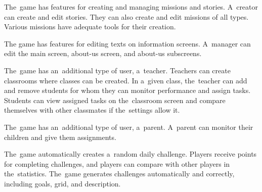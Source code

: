 \begin{enumerate}[label=\textbf{F\arabic*}, ref=\labelenumi]
     The~game has features for creating and managing missions and stories.
    A~creator can create and edit stories.
    They can also create and edit missions of all types.
    Various missions have adequate tools for their creation.

     The game has features for editing texts on information screens.
    A~manager can edit the main screen, about-us screen, and about-us subscreens.

     The~game has an~additional type of user, a~teacher.
    Teachers can create classrooms where classes can be created.
    In a~given class, the~teacher can add and remove students for whom they can monitor performance and assign tasks.
    Students can view assigned tasks on the~classroom screen and compare themselves with other classmates if the~settings allow it.

     The~game has an~additional type of user, a~parent.
    A~parent can monitor their children and give them assignments.

     The~game automatically creates a~random daily challenge.
    Players receive points for completing challenges, and players can compare with other players in the~statistics.
    The~game generates challenges automatically and correctly, including goals, grid, and description.
\end{enumerate}
